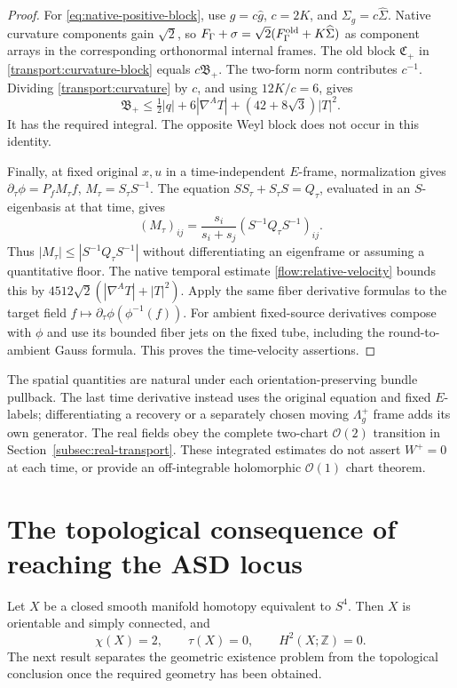 \documentclass[11pt]{article}
\numberwithin{equation}{section}
\theoremstyle{definition}
\theoremstyle{remark}
\begin{document}
\begin{proof}
For \eqref{eq:native-positive-block}, use
\(g=c\widehat g\), \(c=2K\), and
\(\Sigma_g=c\widehat\Sigma\). Native curvature
components gain \(\sqrt2\), so
\(F_\Gamma+\sigma=\sqrt2(F_\Gamma^{\rm old}
+K\widehat\Sigma)\) as component arrays in the
corresponding orthonormal internal frames.
The old block \(\mathfrak C_+\) in
\eqref{transport:curvature-block} equals \(c\mathfrak B_+\).
The two-form norm contributes
\(c^{-1}\). Dividing \eqref{transport:curvature}
by \(c\), and using \(12K/c=6\), gives
\[
 \mathfrak B_+\le\tfrac12|q|+
                  6|\nabla^AT|+(42+8\sqrt3)|T|^2 .
\]
It has the required integral. The opposite Weyl block
does not occur in this identity.

Finally, at fixed original \(x,u\) in a time-independent
\(E\)-frame, normalization gives
\(\partial_\tau\phi=P_fM_\tau f\), \(M_\tau=S_\tau S^{-1}\).
The equation \(SS_\tau+S_\tau S=Q_\tau\), evaluated
in an \(S\)-eigenbasis at that time, gives
\[
 (M_\tau)_{ij}=\frac{s_i}{s_i+s_j}
                         (S^{-1}Q_\tau S^{-1})_{ij}.
\]
Thus \(|M_\tau|\le|S^{-1}Q_\tau S^{-1}|\)
without differentiating an eigenframe or assuming
a quantitative floor. The native temporal estimate
\eqref{flow:relative-velocity}
bounds this by \(4512\sqrt2(|\nabla^AT|+|T|^2)\).
Apply the same fiber derivative formulas to the target
field \(f\mapsto\partial_\tau\phi(\phi^{-1}(f))\).
For ambient fixed-source derivatives compose with \(\phi\)
and use its bounded fiber jets on the fixed tube,
including the round-to-ambient Gauss formula.
This proves the time-velocity assertions.
\end{proof}

The spatial quantities are natural under each
orientation-preserving bundle pullback. The last time
derivative instead uses the original equation and fixed
\(E\)-labels; differentiating a recovery or a separately
chosen moving \(\Lambda_g^+\) frame adds its own generator.
The real fields obey the complete two-chart
\(\mathcal O(2)\) transition in
Section~\ref{subsec:real-transport}.
These integrated estimates do not assert \(W^+=0\)
at each time, or provide an off-integrable holomorphic
\(\mathcal O(1)\) chart theorem.


\section{The topological consequence of reaching the ASD locus}
\label{sec:ctx-topology}

Let $X$ be a closed smooth manifold homotopy equivalent to $S^4$.
Then $X$ is orientable and simply connected, and
\begin{equation}\label{eq:ctx-sphere-topology}
 \chi(X)=2,\qquad \tau(X)=0,\qquad H^2(X;\mathbb Z)=0.
\end{equation}
The next result separates the geometric existence problem from the
topological conclusion once the required geometry has been obtained.
\end{document}
